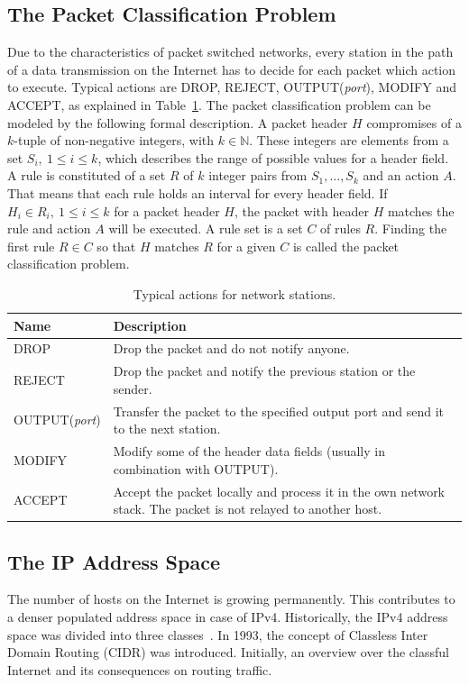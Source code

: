 \documentclass[a4paper,
		12pt,
		parskip=full,
		titlepage
		]{scrartcl}
\begin{document}
\subsection{The Packet Classification Problem}
Due to the characteristics of packet switched networks, every station in the path of a data transmission on the Internet 
has to decide for each packet which action to execute.
Typical actions are DROP, REJECT, OUTPUT(\textit{port}), MODIFY and ACCEPT, as explained in Table~\ref{table:actions}.
The packet classification problem can be modeled by the following formal description.
A packet header $H$ compromises of a $k$-tuple of non-negative integers, with $k \in \mathds{N}$.
These integers are elements from a set $S_i,\ 1 \leq i \leq k$, which describes the range of possible values for a header field.
A rule is constituted of a set $R$ of $k$ integer pairs from $S_1,\dots,S_k$ and an action $A$.
That means that each rule holds an interval for every header field.
If $H_i \in R_i,\ 1 \leq i \leq k$ for a packet header $H$, the packet with header $H$ matches the rule and action $A$ will be executed.
A rule set is a set $C$ of rules $R$.
Finding the first rule $R \in C$ so that $H$ matches 
$R$ for a given $C$ is called the packet classification problem.

\begin{table}
  \centering
  \begin{tabularx}{\textwidth}{l|X}
  Name&Description\\
  \hline
  DROP&Drop the packet and do not notify anyone.\\
  REJECT&Drop the packet and notify the previous station or the sender.\\
  OUTPUT(\textit{port})&Transfer the packet to the specified output port and send it to the next station.\\
  MODIFY&Modify some of the header data fields (usually in combination with OUTPUT).\\
  ACCEPT&Accept the packet locally and process it in the own network stack. The packet is not relayed to another host.\\
  \end{tabularx}
  \caption{Typical actions for network stations.}
  \label{table:actions}
\end{table}

\subsection{The IP Address Space}
The number of hosts on the Internet is growing permanently.
This contributes to a denser populated address space in case of IPv4.
Historically, the IPv4 address space was divided into three classes~\cite{rfc1466}.
In 1993, the concept of Classless Inter Domain Routing (CIDR) was introduced.
Initially, an overview over the classful Internet and its consequences on routing traffic.
\end{document}
